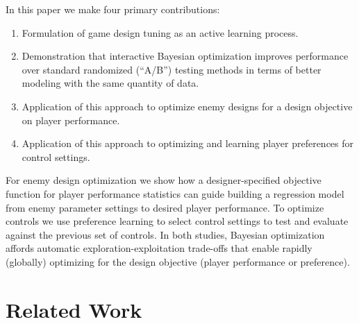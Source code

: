 \documentclass[letterpaper]{article}
\begin{document}
In this paper we make four primary contributions:
\begin{enumerate}
\item Formulation of game design tuning as an active learning process.
\item Demonstration that interactive Bayesian optimization improves performance 
over standard randomized (``A/B'') testing methods in terms of better modeling with the same quantity of data.
\item Application of this approach to optimize enemy designs for a design objective on player performance.
\item Application of this approach to optimizing and learning player preferences for control settings.
\end{enumerate}

\noindent
For enemy design optimization we show how a designer-specified objective function for player performance statistics can guide building a regression model from enemy parameter settings to desired player performance. To optimize controls we use preference learning to select control settings to test and evaluate against the previous set of controls. 
In both studies, Bayesian optimization affords automatic exploration-exploitation trade-offs that enable rapidly (globally) optimizing for the design objective (player performance or preference).




\section{Related Work}
\end{document}
